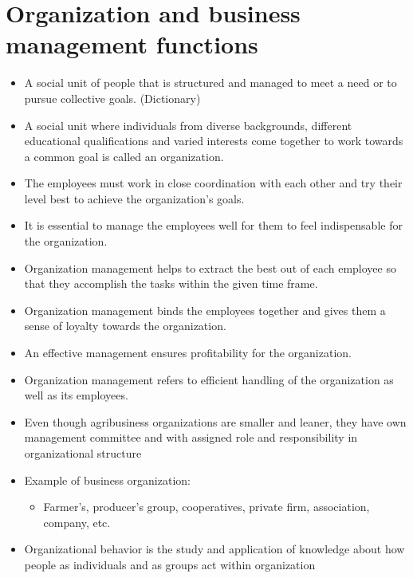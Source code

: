 \documentclass[12pt,ignorenonframetext,aspectratio=169]{beamer}
\providecommand{\tightlist}{%
  \setlength{\itemsep}{0pt}\setlength{\parskip}{0pt}}
\begin{document}
\hypertarget{organization-and-business-management-functions}{%
\section{Organization and business management
functions}\label{organization-and-business-management-functions}}

\begin{frame}{}
\protect\hypertarget{section-1}{}
\begin{itemize}
\tightlist
\item
  A social unit of people that is structured and managed to meet a need
  or to pursue collective goals. (Dictionary)
\item
  A social unit where individuals from diverse backgrounds, different
  educational qualifications and varied interests come together to work
  towards a common goal is called an organization.
\item
  The employees must work in close coordination with each other and try
  their level best to achieve the organization's goals.
\item
  It is essential to manage the employees well for them to feel
  indispensable for the organization.
\item
  Organization management helps to extract the best out of each employee
  so that they accomplish the tasks within the given time frame.
\item
  Organization management binds the employees together and gives them a
  sense of loyalty towards the organization.
\end{itemize}
\end{frame}

\begin{frame}{}
\protect\hypertarget{section-2}{}
\begin{itemize}
\tightlist
\item
  An effective management ensures profitability for the organization.
\item
  Organization management refers to efficient handling of the
  organization as well as its employees.
\item
  Even though agribusiness organizations are smaller and leaner, they
  have own management committee and with assigned role and
  responsibility in organizational structure
\item
  Example of business organization:

  \begin{itemize}
  \tightlist
  \item
    Farmer's, producer's group, cooperatives, private firm, association,
    company, etc.
  \end{itemize}
\item
  Organizational behavior is the study and application of knowledge
  about how people as individuals and as groups act within organization
\end{itemize}
\end{frame}
\end{document}
